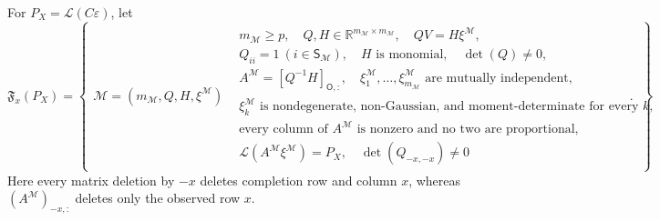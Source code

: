 For \(P_X=\mathcal L(C\varepsilon)\), let
\[
\mathfrak F_x(P_X)=\left\{\begin{array}{l|l}
\mathcal M=(m_{\mathcal M},Q,H,\xi^{\mathcal M})
&\begin{array}{l}
m_{\mathcal M}\ge p,\quad Q,H\in\mathbb R^{m_{\mathcal M}\times m_{\mathcal M}},\quad
QV=H\xi^{\mathcal M},\\
Q_{ii}=1\ (i\in\mathsf S_{\mathcal M}),\quad H\text{ is monomial},\quad \det(Q)\ne0,\\
A^{\mathcal M}=[Q^{-1}H]_{\mathsf O,:},\quad
\xi^{\mathcal M}_1,\ldots,\xi^{\mathcal M}_{m_{\mathcal M}}\text{ are mutually independent,}\\
\xi^{\mathcal M}_k\text{ is nondegenerate, non-Gaussian, and moment-determinate for every }k,\\
\text{every column of }A^{\mathcal M}\text{ is nonzero and no two are proportional},\\
\mathcal L(A^{\mathcal M}\xi^{\mathcal M})=P_X,\quad
\det(Q_{-x,-x})\ne0
\end{array}
\end{array}\right\}.
\]
Here every matrix deletion by \(-x\) deletes completion row and column \(x\), whereas \((A^{\mathcal M})_{-x,:}\) deletes only the observed row \(x\).